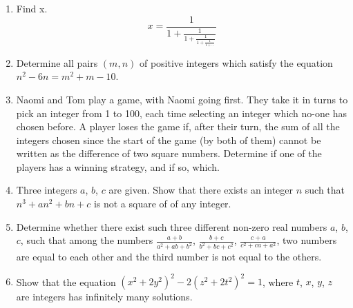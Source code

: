 \documentclass{article}
\begin{document}
  \begin{enumerate}
    \item Find x.
    $$x = \frac{1}{1 + \frac{1}{1 + \frac{1}{1 + \frac{1}{1 + \ldots}}}}$$
    \item Determine all pairs $(m, n)$ of positive integers which satisfy the equation $n^{2} - 6n = m^{2} + m - 10$.
    \item Naomi and Tom play a game, with Naomi going first. They take it in turns to pick an integer from 1 to 100, each time selecting an integer which no-one has chosen before. A player loses the game if, after their turn, the sum of all the integers chosen since the start of the game (by both of them) cannot be written as the difference of two square numbers. Determine if one of the players has a winning strategy, and if so, which.
    \item Three integers $a$, $b$, $c$ are given. Show that there exists an integer $n$ such that $n^{3} + {a}{n^{2}} + b{n} + c$ is not a square of of any integer.
    \item Determine whether there exist such three different non-zero real numbers $a$, $b$, $c$, such that
    among the numbers $\frac{a + b}{a^{2} + ab + b^{2}}$, $\frac{b + c}{b^{2} + bc + c^{2}}$, $\frac{c + a}{c^{2} + ca + a^{2}}$, two numbers are equal to each other and the third number is not equal to the others.
    \item Show that the equation $(x^{2} + 2y^{2})^{2} - 2(z^{2} + 2t^{2})^{2} = 1$, where $t$, $x$, $y$, $z$ are integers has infinitely many solutions.
  \end{enumerate}
\end{document}
